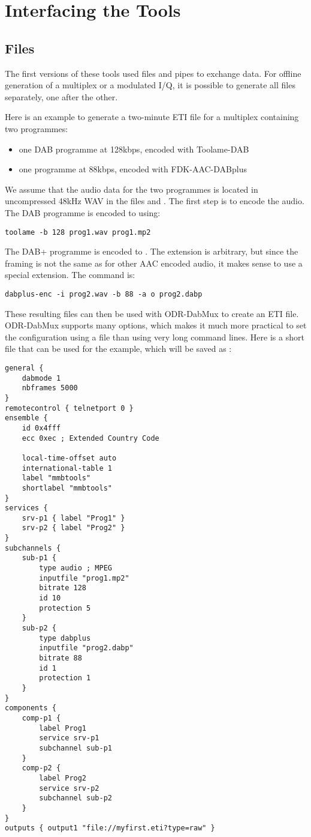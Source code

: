\section{Interfacing the Tools}
\subsection{Files}
\label{sec-files}
The first versions of these tools used files and pipes to exchange data. For
offline generation of a multiplex or a modulated I/Q, it is possible to
generate all files separately, one after the other.

Here is an example to generate a two-minute ETI file for a multiplex containing two programmes:
\begin{itemize}
    \item one DAB programme at 128kbps, encoded with Toolame-DAB
    \item one \dabplus{} programme at 88kbps, encoded with FDK-AAC-DABplus
\end{itemize}

We assume that the audio data for the two programmes is located in uncompressed
48kHz WAV in the files  and . The first step
is to encode the audio. The DAB programme is encoded to  using:
\begin{lstlisting}
toolame -b 128 prog1.wav prog1.mp2
\end{lstlisting}

The DAB+ programme is encoded to . The extension
 is arbitrary, but since the framing is not the same as for
other AAC encoded audio, it makes sense to use a special extension. The command
is:
\begin{lstlisting}
dabplus-enc -i prog2.wav -b 88 -a o prog2.dabp
\end{lstlisting}

These resulting files can then be used with ODR-DabMux to create an ETI file.
ODR-DabMux supports many options, which makes it much more practical to set
the configuration using a file than using very long command lines. Here is a short
file that can be used for the example, which will be saved as :
\begin{lstlisting}
general {
    dabmode 1
    nbframes 5000
}
remotecontrol { telnetport 0 }
ensemble {
    id 0x4fff
    ecc 0xec ; Extended Country Code

    local-time-offset auto
    international-table 1
    label "mmbtools"
    shortlabel "mmbtools"
}
services {
    srv-p1 { label "Prog1" }
    srv-p2 { label "Prog2" }
}
subchannels {
    sub-p1 {
        type audio ; MPEG
        inputfile "prog1.mp2"
        bitrate 128
        id 10
        protection 5
    }
    sub-p2 {
        type dabplus
        inputfile "prog2.dabp"
        bitrate 88
        id 1
        protection 1
    }
}
components {
    comp-p1 {
        label Prog1
        service srv-p1
        subchannel sub-p1
    }
    comp-p2 {
        label Prog2
        service srv-p2
        subchannel sub-p2
    }
}
outputs { output1 "file://myfirst.eti?type=raw" }
\end{lstlisting}

